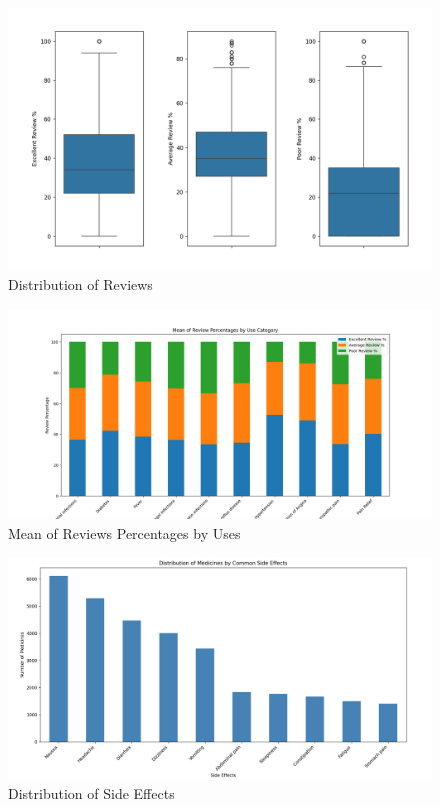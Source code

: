 \documentclass[sigconf]{acmart}
\begin{document}
\begin{figure}[H]
	\centering
	\includegraphics[width=\linewidth]{graphic2.png}
	\caption{Distribution of Reviews}
	\label{fig:reviewDistribution}
  \end{figure}

\begin{figure}[H]
	\centering
	\includegraphics[width=\linewidth]{graphic3.png}
	\caption{Mean of Reviews Percentages by Uses}
	\label{fig:reviewPercMean}
  \end{figure}

\begin{figure}[H]
	\centering
	\includegraphics[width=\linewidth]{graphic4.png}
	\caption{Distribution of Side Effects}
	\label{fig:sideEffectsDistribution}
  \end{figure}
\end{document}

